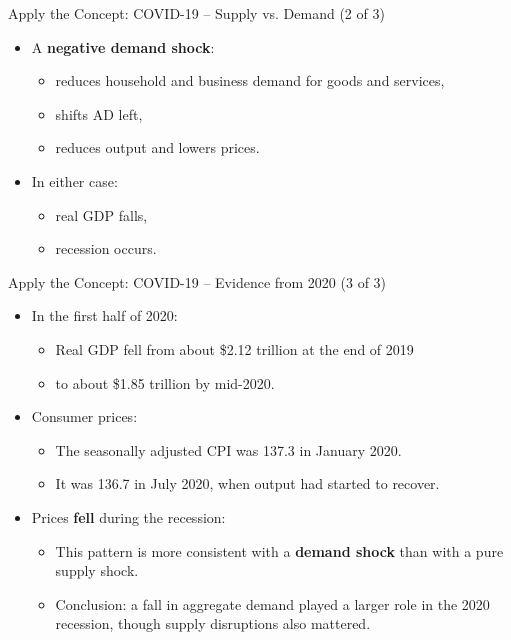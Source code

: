 \documentclass[aspectratio=169]{beamer}
\begin{document}
\begin{frame}{Apply the Concept: COVID-19 -- Supply vs. Demand (2 of 3)}
\transfade
\begin{itemize}[<+->]
  \item A \textbf{negative demand shock}:
  \begin{itemize}[<+->]
    \item reduces household and business demand for goods and services,
    \item shifts AD left,
    \item reduces output and lowers prices.
  \end{itemize}
  \item In either case:
  \begin{itemize}[<+->]
    \item real GDP falls,
    \item recession occurs.
  \end{itemize}
\end{itemize}
\end{frame}

\begin{frame}{Apply the Concept: COVID-19 -- Evidence from 2020 (3 of 3)}
\transfade
\begin{itemize}[<+->]
  \item In the first half of 2020:
  \begin{itemize}[<+->]
    \item Real GDP fell from about \$2.12 trillion at the end of 2019
    \item to about \$1.85 trillion by mid-2020.
  \end{itemize}
  \item Consumer prices:
  \begin{itemize}[<+->]
    \item The seasonally adjusted CPI was 137.3 in January 2020.
    \item It was 136.7 in July 2020, when output had started to recover.
  \end{itemize}
  \item Prices \textbf{fell} during the recession:
  \begin{itemize}[<+->]
    \item This pattern is more consistent with a \textbf{demand shock} than with a pure supply shock.
    \item Conclusion: a fall in aggregate demand played a larger role in the 2020 recession, though supply disruptions also mattered.
  \end{itemize}
\end{itemize}
\end{frame}
\end{document}
